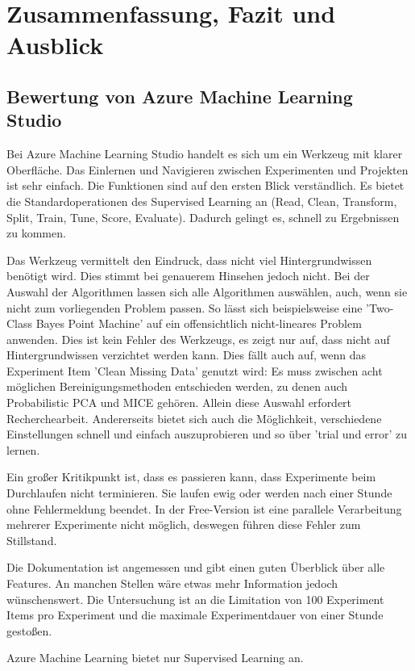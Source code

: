 \chapter{Zusammenfassung, Fazit und Ausblick}\label{chap:Bewertung}

\section{Bewertung von Azure Machine Learning Studio}\label{sec:BeswertungAzure}
Bei Azure Machine Learning Studio handelt es sich um ein Werkzeug mit klarer Oberfläche. Das Einlernen und Navigieren zwischen Experimenten und Projekten ist sehr einfach. Die Funktionen sind auf den ersten Blick verständlich. Es bietet die Standardoperationen des Supervised Learning an (Read, Clean, Transform, Split, Train, Tune, Score, Evaluate). Dadurch gelingt es, schnell zu Ergebnissen zu kommen.\par
Das Werkzeug vermittelt den Eindruck, dass nicht viel Hintergrundwissen benötigt wird. Dies stimmt bei genauerem Hinsehen jedoch nicht. Bei der Auswahl der Algorithmen lassen sich alle Algorithmen auswählen, auch, wenn sie nicht zum vorliegenden Problem passen. So lässt sich beispielsweise eine 'Two-Class Bayes Point Machine' auf ein offensichtlich nicht-lineares Problem anwenden. Dies ist kein Fehler des Werkzeugs, es zeigt nur auf, dass nicht auf Hintergrundwissen verzichtet werden kann. Dies fällt auch auf, wenn  das Experiment Item 'Clean Missing Data' genutzt wird: Es muss zwischen acht möglichen Bereinigungsmethoden entschieden werden, zu denen auch Probabilistic PCA und MICE gehören. Allein diese Auswahl erfordert Recherchearbeit.
Andererseits bietet sich auch die Möglichkeit, verschiedene Einstellungen schnell und einfach auszuprobieren und so über 'trial und error' zu lernen.\par
Ein großer Kritikpunkt ist, dass es passieren kann, dass Experimente beim Durchlaufen nicht terminieren. Sie laufen ewig oder werden nach einer Stunde ohne Fehlermeldung beendet. In der Free-Version ist eine parallele Verarbeitung mehrerer Experimente nicht möglich, deswegen führen diese Fehler zum Stillstand.\par
Die Dokumentation ist angemessen und gibt einen guten Überblick über alle Features. An manchen Stellen wäre etwas mehr Information jedoch wünschenswert. Die Untersuchung ist an die Limitation von 100 Experiment Items pro Experiment und die maximale Experimentdauer von einer Stunde gestoßen.\par
Azure Machine Learning bietet nur Supervised Learning an.\par
